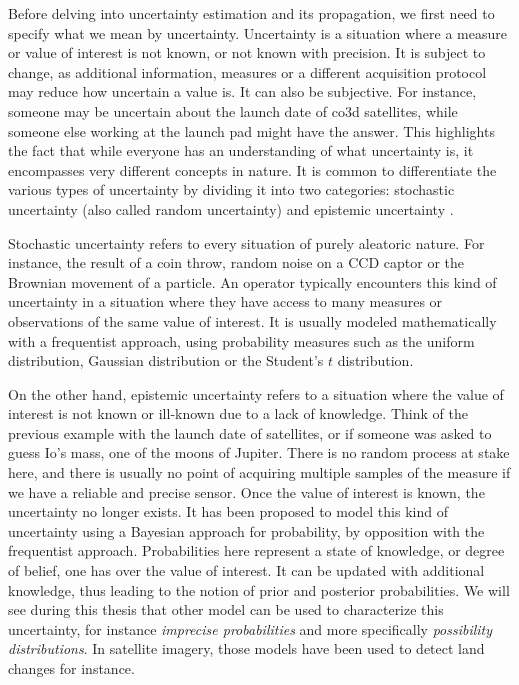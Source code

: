 Before delving into uncertainty estimation and its propagation, we first need to specify what we mean by uncertainty. Uncertainty is a situation where a measure or value of interest is not known, or not known with precision. It is subject to change, as additional information, measures or a different acquisition protocol may reduce how uncertain a value is. It can also be subjective. For instance, someone may be uncertain about the launch date of \acrshort{co3d} satellites, while someone else working at the launch pad might have the answer. This highlights the fact that while everyone has an understanding of what uncertainty is, it encompasses very different concepts in nature. It is common to differentiate the various types of uncertainty by dividing it into two categories: stochastic uncertainty (also called random uncertainty) and epistemic uncertainty \cite{hora_aleatory_1996,frank_treatment_1999}.

Stochastic uncertainty refers to every situation of purely aleatoric nature. For instance, the result of a coin throw, random noise on a CCD captor or the Brownian movement of a particle. An operator typically encounters this kind of uncertainty in a situation where they have access to many measures or observations of the same value of interest. It is usually modeled mathematically with a frequentist approach, using probability measures such as the uniform distribution, Gaussian distribution or the Student's $t$ distribution.

On the other hand, epistemic uncertainty refers to a situation where the value of interest is not known or ill-known due to a lack of knowledge. Think of the previous example with the launch date of satellites, or if someone was asked to guess Io's mass, one of the moons of Jupiter. There is no random process at stake here, and there is usually no point of acquiring multiple samples of the measure if we have a reliable and precise sensor. Once the value of interest is known, the uncertainty no longer exists. It has been proposed to model this kind of uncertainty using a Bayesian approach for probability, by opposition with the frequentist approach. Probabilities here represent a state of knowledge, or degree of belief, one has over the value of interest. It can be updated with additional knowledge, thus leading to the notion of prior and posterior probabilities. We will see during this thesis that other model can be used to characterize this uncertainty, for instance \textit{imprecise probabilities} and more specifically \textit{possibility distributions}. In satellite imagery, those models have been used to detect land changes \cite{lesniewska-choquet_specialite_2020} for instance.

